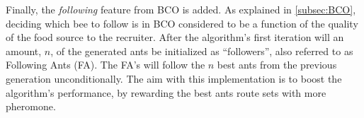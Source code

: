 Finally, the \textit{following} feature from BCO is added. As explained in \vref{subsec:BCO}, deciding which bee to follow is in BCO considered to be a function of the quality of the food source to the recruiter. After the algorithm's first iteration will an amount, $n$, of the generated ants be initialized as ``followers'', also referred to as Following Ants (FA). The FA's will follow the $n$ best ants from the previous generation unconditionally. The aim with this implementation is to boost the algorithm's performance, by rewarding the best ants route sets with more pheromone.






